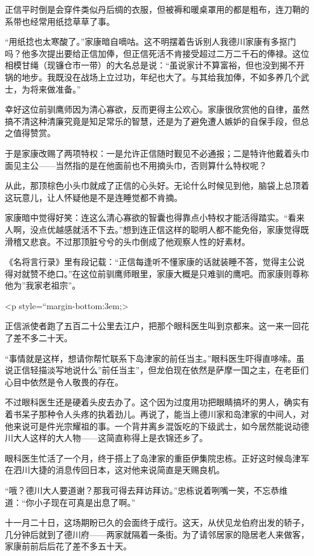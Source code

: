 \documentclass[
]{book}
\begin{document}
正信平时倒是会穿件类似丹后绸的衣服，但被褥和暖桌罩用的都是粗布，连刀鞘的系带也经常用纸捻草草了事。

``用纸捻也太寒酸了。''家康暗自嘀咕。这不明摆着告诉别人我德川家康有多抠门吗？他多次提出要给正信加俸，但正信死活不肯接受超过二万二千石的俸禄。这位相模甘绳（现镰仓市一带）的大名总是说：``虽说家计不算富裕，但也没到揭不开锅的地步。我既没在战场上立过功，年纪也大了。与其给我加俸，不如多养几个武士，为将来做准备。''

幸好这位前驯鹰师因为清心寡欲，反而更得主公欢心。家康很欣赏他的自律，虽然搞不清这种清廉究竟是知足常乐的智慧，还是为了避免遭人嫉妒的自保手段，但总之值得赞赏。

于是家康改赐了两项特权：一是允许正信随时觐见不必通报；二是特许他戴着头巾面见主公------当然指的是在他面前也不用摘头巾，否则算什么特权呢？

从此，那顶棕色小头巾就成了正信的心头好。无论什么时候见到他，脑袋上总顶着这玩意儿，让人怀疑他是不是连睡觉都不肯摘。

家康暗中觉得好笑：连这么清心寡欲的智囊也得靠点小特权才能活得踏实。``看来人啊，没点优越感就活不下去。''想到连正信这样的聪明人都不能免俗，家康觉得既滑稽又悲哀。不过那顶脏兮兮的头巾倒成了他观察人性的好素材。

《名将言行录》里有段记载：``正信每逢听不懂家康的话就装睡不答，觉得主公说得对就赞不绝口。''在这位前驯鹰师眼里，家康大概是只难驯的鹰吧。而家康则尊称他为''我家老祖宗''。

\textless p style=``margin-bottom:3em;\textgreater{}

正信派使者跑了五百二十公里去江户，把那个眼科医生叫到京都来。这一来一回花了差不多二十天。

``事情就是这样，想请你帮忙联系下岛津家的前任当主。''眼科医生吓得直哆嗦。虽说正信轻描淡写地说什么''前任当主''，但龙伯现在依然是萨摩一国之主，在老臣们心目中依然是令人敬畏的存在。

不过眼科医生还是硬着头皮去办了。这个因为过度用功把眼睛搞坏的男人，确实有着书呆子那种令人头疼的执着劲儿。再说了，能当上德川家和岛津家的中间人，对他来说可是件光宗耀祖的事。一个背井离乡混饭吃的下级武士，如今居然能说动德川大人这样的大人物------这简直称得上是衣锦还乡了。

眼科医生忙活了一个月，终于搭上了岛津家的重臣伊集院忠栋。正好这时候岛津军在泗川大捷的消息传回日本，这对他来说简直是天赐良机。

``哦？德川大人要道谢？那我可得去拜访拜访。''忠栋说着咧嘴一笑，不忘恭维道：``你小子现在可真是出息了啊。''

十一月二十日，这场期盼已久的会面终于成行。这天，从伏见龙伯府出发的轿子，几分钟后就到了德川府------两家就隔着一条街。为了请邻居家的隐居老人来做客，家康前前后后花了差不多五十天。
\end{document}
